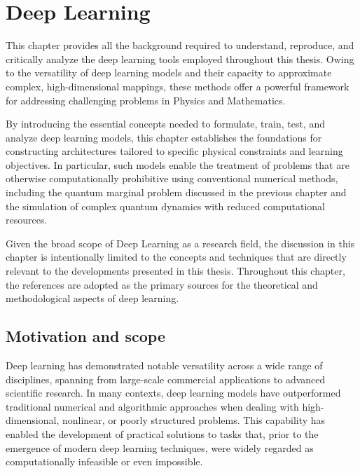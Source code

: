 \chapter{Deep Learning}
\label{sec:deep_learning}

This chapter provides all the background required to understand, reproduce, and critically analyze the deep learning tools employed throughout this thesis. Owing to the versatility of deep learning models and their capacity to approximate complex, high-dimensional mappings, these methods offer a powerful framework for addressing challenging problems in Physics and Mathematics.

By introducing the essential concepts needed to formulate, train, test, and analyze deep learning models, this chapter establishes the foundations for constructing architectures tailored to specific physical constraints and learning objectives. In particular, such models enable the treatment of problems that are otherwise computationally prohibitive using conventional numerical methods, including the quantum marginal problem discussed in the previous chapter and the simulation of complex quantum dynamics with reduced computational resources.

Given the broad scope of Deep Learning as a research field, the discussion in this chapter is intentionally limited to the concepts and techniques that are directly relevant to the developments presented in this thesis. Throughout this chapter, the references \cite{Goodfellow2016, Neuer2021} are adopted as the primary sources for the theoretical and methodological aspects of deep learning.

\section{Motivation and scope}
\label{sec:dl_motivation}

Deep learning has demonstrated notable versatility across a wide range of disciplines, spanning from large-scale commercial applications to advanced scientific research. In many contexts, deep learning models have outperformed traditional numerical and algorithmic approaches when dealing with high-dimensional, nonlinear, or poorly structured problems. This capability has enabled the development of practical solutions to tasks that, prior to the emergence of modern deep learning techniques, were widely regarded as computationally infeasible or even impossible.

